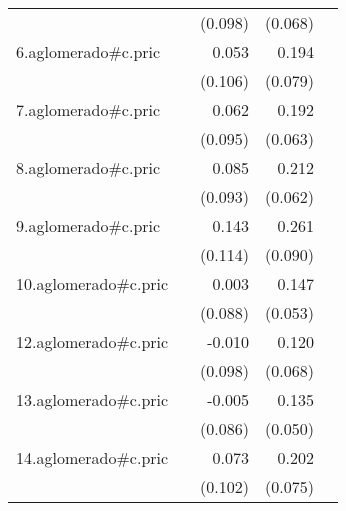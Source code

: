 {\begin{longtable}{l*{4}{D{.}{.}{-1}}}
            &                     &     (0.098)         &     (0.068)         &                     \\
\addlinespace
6.aglomerado#c.pric&                     &       0.053         &       0.194\sym{*}  &                     \\
            &                     &     (0.106)         &     (0.079)         &                     \\
\addlinespace
7.aglomerado#c.pric&                     &       0.062         &       0.192\sym{**} &                     \\
            &                     &     (0.095)         &     (0.063)         &                     \\
\addlinespace
8.aglomerado#c.pric&                     &       0.085         &       0.212\sym{***}&                     \\
            &                     &     (0.093)         &     (0.062)         &                     \\
\addlinespace
9.aglomerado#c.pric&                     &       0.143         &       0.261\sym{**} &                     \\
            &                     &     (0.114)         &     (0.090)         &                     \\
\addlinespace
10.aglomerado#c.pric&                     &       0.003         &       0.147\sym{**} &                     \\
            &                     &     (0.088)         &     (0.053)         &                     \\
\addlinespace
12.aglomerado#c.pric&                     &      -0.010         &       0.120         &                     \\
            &                     &     (0.098)         &     (0.068)         &                     \\
\addlinespace
13.aglomerado#c.pric&                     &      -0.005         &       0.135\sym{**} &                     \\
            &                     &     (0.086)         &     (0.050)         &                     \\
\addlinespace
14.aglomerado#c.pric&                     &       0.073         &       0.202\sym{**} &                     \\
            &                     &     (0.102)         &     (0.075)         &                     \\

\end{longtable}}
